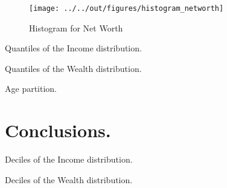 \documentclass[11pt, a4paper, leqno]{article}
\begin{document}
\begin{figure}
    \caption{Histogram for Net Worth}
    
    \texttt{[image: ../../out/figures/histogram\_networth]}
    \label{fig:histnetworth}
\end{figure}

\begin{table}
    \caption{Quantiles of the Income distribution.}
    \resizebox{\textwidth}{!}{}
    \label{tab:quintilesincome}
\end{table}


\begin{table}
    \caption{Quantiles of the Wealth distribution.}
    \resizebox{\textwidth}{!}{}
    \label{tab:quintilesnetworth}
\end{table}

\begin{table}
    \caption{Age partition.}
    \resizebox{\textwidth}{!}{}
    \label{tab:agepartition}
\end{table}

\section{Conclusions.}









\begin{table}
    \caption{Deciles of the Income distribution.}
    \resizebox{\textwidth}{!}{}
\end{table}

\begin{table}
    \caption{Deciles of the Wealth distribution.}
    \resizebox{\textwidth}{!}{}
\end{table}

\end{document}

